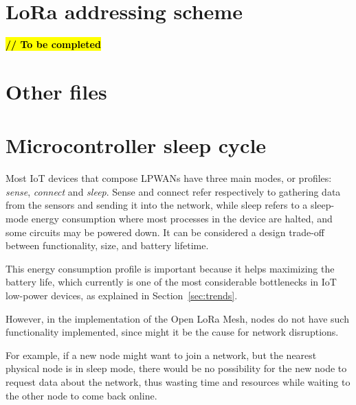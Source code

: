 	\section{LoRa addressing scheme}\label{subsec:lora_addressing}

		\textbf{\textcolor{red}{\hl{// To be completed}}}
		
		
		
		
	\section{Other files}
	
		
	\section{Microcontroller sleep cycle}\label{sec:sleep}
	
		Most IoT devices that compose LPWANs have three main modes, or profiles: \textit{sense}, \textit{connect} and \textit{sleep}.
		Sense and connect refer respectively to gathering data from the sensors and sending it into the network, while sleep refers to a sleep-mode energy consumption where most processes in the device are halted, and some circuits may be powered down.
		It can be considered a design trade-off between functionality, size, and battery lifetime.
		
		This energy consumption profile is important because it helps maximizing the battery life, which currently is one of the most considerable bottlenecks in IoT low-power devices, as explained in Section~\ref{sec:trends}.
		
		However, in the implementation of the Open LoRa Mesh, nodes do not have such functionality implemented, since might it be the cause for network disruptions.
		
		For example, if a new node might want to join a network, but the nearest physical node is in sleep mode, there would be no possibility for the new node to request data about the network, thus wasting time and resources while waiting to the other node to come back online.
		
